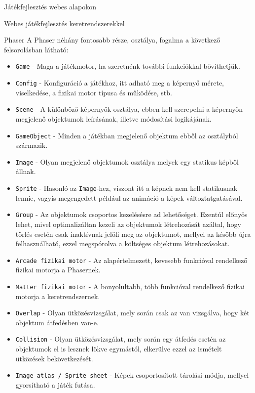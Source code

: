 \begin{MyChapter}{Játékfejlesztés webes alapokon}
\begin{MySection}{Webes játékfejlesztés keretrendszerekkel}
\begin{MySubSection}{Phaser}
			A Phaser néhány fontosabb része, osztálya, fogalma a következő felsorolásban látható:
			\begin{itemize}
				\item \texttt{Game} - Maga a játékmotor, ha szeretnénk további funkciókkal bővíthetjük.
				\item \texttt{Config} - Konfiguráció a játékhoz, itt adható meg a képernyő mérete, viselkedése, a fizikai motor típusa és működése, stb.
				\item \texttt{Scene} - A különböző képernyők osztálya, ebben kell szerepelni a képernyőn megjelenő objektumok leírásának, illetve módosítási logikájának.
				\item \texttt{GameObject} - Minden a játékban megjelenő objektum ebből az osztályból származik.
				\item \texttt{Image} - Olyan megjelenő objektumok osztálya melyek egy statikus képből állnak.
				\item \texttt{Sprite} - Hasonló az \texttt{Image}-hez, viszont itt a képnek nem kell statikusnak lennie, vagyis megengedett például az animáció a képek változtatgatásával.
				\item \texttt{Group} - Az objektumok csoportos kezelésésre ad lehetőséget. Ezentúl előnyös lehet, mivel optimalizáltan kezeli az objektumok létrehozását azáltal, hogy törlés esetén csak inaktívnak jelöli meg az objektumot, mellyel az később újra felhasználható, ezzel megspórolva a költséges objektum létrehozásokat.
				\item \texttt{Arcade fizikai motor} - Az alapértelmezett, kevesebb funkcióval rendelkező fizikai motorja a Phasernek.
				\item \texttt{Matter fizikai motor} - A bonyolultabb, több funkcióval rendelkező fizikai motorja a keretrendszernek.
				\item \texttt{Overlap} - Olyan ütközésvizsgálat, mely során csak az van vizsgálva, hogy két objektum átfedésben van-e.
				\item \texttt{Collision} - Olyan ütközésvizsgálat, mely során egy átfedés esetén az objektumok el is lesznek lökve egymástól, elkerülve ezzel az ismételt ütközések bekövetkezését.
				\item \texttt{Image atlas / Sprite sheet} - Képek csoportosított tárolási módja, mellyel gyorsítható a játék futása.
			\end{itemize}

		\end{MySubSection}
			

\end{MySection}
\end{MyChapter}
